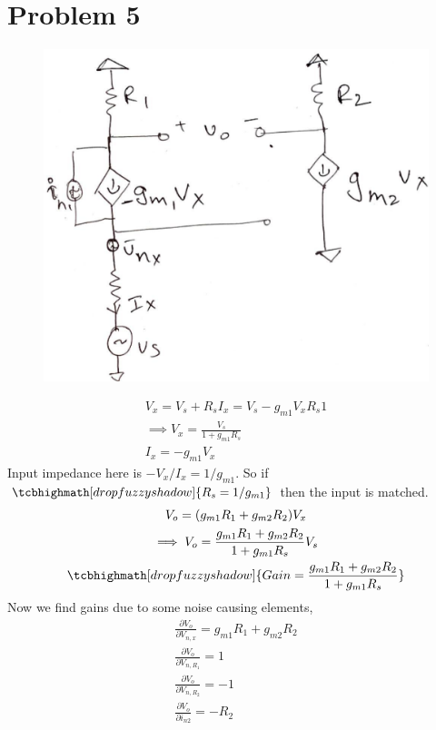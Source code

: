 \documentclass{article}
\begin{document}
\section*{\hfil Problem 5}
\begin{figure}[H]
	\centering
	\includegraphics[scale=0.25]{./figs/q4.jpeg}
\end{figure}
\begin{gather*}
	V_x = V_s + R_sI_x = V_s - g_{m1}V_xR_s1\\
	\implies V_x = \frac{V_s}{1+g_{m1}R_s}\\
	I_x = -g_{m1}V_x
\end{gather*}
Input impedance here is $-V_x/I_x = 1/g_{m1}$. So if $\tcbhighmath[drop fuzzy shadow]{R_s = 1/g_{m1}}$ then the input is matched.
\begin{gather*}
	V_o = (g_{m1}R_1 + g_{m2}R_2)V_x\\
	\implies V_o = \frac{g_{m1}R_1 + g_{m2}R_2}{1+g_{m1}R_s}V_s\\
	\tcbhighmath[drop fuzzy shadow]{Gain = \frac{g_{m1}R_1 + g_{m2}R_2}{1+g_{m1}R_s}}
\end{gather*}
Now we find gains due to some noise causing elements,
\begin{gather*}
	\frac{\partial V_o}{\partial V_{n,x}} = g_{m1}R_1 + g_{m2}R_2\\
	\frac{\partial V_o}{\partial V_{n, R_1}} = 1\\
	\frac{\partial V_o}{\partial V_{n, R_2}} = -1\\
	\frac{\partial V_o}{\partial i_{n2}} = -R_2\\
\end{gather*}
\end{document}
